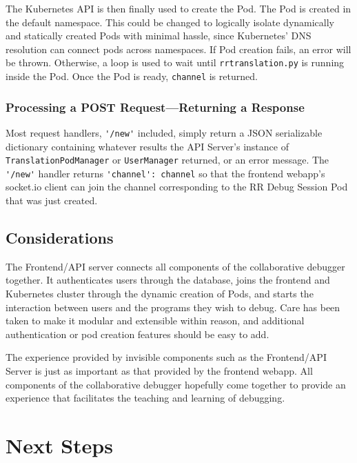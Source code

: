 \documentclass[12pt]{article}
\begin{document}
The Kubernetes API is then finally used to create the Pod.  The Pod is
created in the default namespace.  This could be changed to logically
isolate dynamically and statically created Pods with minimal hassle,
since Kubernetes' DNS resolution can connect pods across namespaces.
If Pod creation fails, an error will be thrown.  Otherwise, a loop is
used to wait until \lstinline{rrtranslation.py} is running inside the
Pod.  Once the Pod is ready, \lstinline{channel} is returned.

\subsubsection{Processing a POST Request---Returning a Response}

Most request handlers, \lstinline{'/new'} included, simply return a
JSON serializable dictionary containing whatever results the API
Server's instance of \lstinline{TranslationPodManager} or
\lstinline{UserManager} returned, or an error message.  The
\lstinline{'/new'} handler returns \lstinline{'channel': channel} so
that the frontend webapp's socket.io client can join the channel
corresponding to the RR Debug Session Pod that was just created.

\subsection{Considerations}

The Frontend/API server connects all components of the collaborative
debugger together.  It authenticates users through the database, joins
the frontend and Kubernetes cluster through the dynamic creation of
Pods, and starts the interaction between users and the programs they
wish to debug.  Care has been taken to make it modular and extensible
within reason, and additional authentication or pod creation features
should be easy to add.
\par

The experience provided by invisible components such as the
Frontend/API Server is just as important as that provided by the
frontend webapp.  All components of the collaborative debugger
hopefully come together to provide an experience that facilitates the
teaching and learning of debugging.

\section{Next Steps} \label{next}
\end{document}
